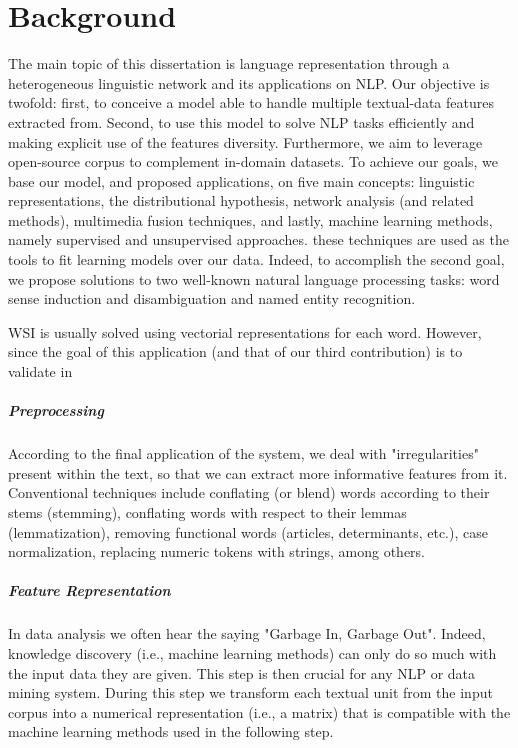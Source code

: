 \chapter{Background}
\label{chap:backgnd}
The main topic of this dissertation is language representation through a heterogeneous linguistic network and its applications on NLP. Our objective is twofold: first, to conceive a model able to handle multiple textual-data features extracted from. Second, to use this model to solve NLP tasks efficiently and making explicit use of the features diversity. Furthermore, we aim to leverage open-source corpus to complement in-domain datasets.  To achieve our goals, we base our model, and proposed applications, on five main concepts: linguistic representations, the distributional hypothesis, network analysis (and related methods),  multimedia fusion techniques, and lastly,  machine learning methods, namely supervised and unsupervised approaches. these techniques are used as the tools to fit learning models over our data. Indeed, to accomplish the second goal,  we propose solutions to two well-known natural language processing tasks: word sense induction and disambiguation and named entity recognition. 


WSI is usually solved using vectorial representations for each word. However, since the goal of this application (and that of our third contribution) is to validate in 


\paragraph {Preprocessing}  According to the final application of the system, we deal with "irregularities" present within the text, so that we can extract more informative features from it. Conventional techniques include conflating (or blend) words according to their stems (stemming), conflating words with respect to their lemmas (lemmatization), removing functional words (articles, determinants, etc.), case normalization, replacing numeric tokens with strings, among others.

\paragraph {Feature Representation} In data analysis we often hear the saying "Garbage In, Garbage Out". Indeed, knowledge discovery (i.e., machine learning methods)  can only do so much with the input data they are given.  This step is then crucial for any NLP or data mining system.   During this step we transform each textual unit from the input corpus into a numerical representation (i.e., a matrix) that is compatible with the machine learning methods used in the following step.

